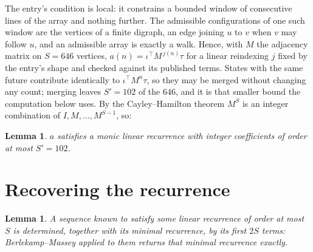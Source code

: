 \documentclass[11pt,a4paper]{article}
\theoremstyle{plain}
\newtheorem{lemma}[theorem]{Lemma}
\theoremstyle{definition}
\begin{document}
The entry's condition is local: it constrains a bounded window of consecutive lines of the
array and nothing further. The admissible configurations of one such window are the vertices
of a finite digraph, an edge joining $u$ to $v$ when $v$ may follow $u$, and an admissible
array is exactly a walk. Hence, with $M$ the adjacency matrix on $S=646$ vertices,
$a(n)=\iota^{\!\top}M^{\,j(n)}\tau$ for a linear reindexing $j$ fixed by the entry's shape
and checked against its published terms. States with the same future contribute identically to $\iota^{\!\top}M^n\tau$, so they may be merged without changing any count; merging leaves $S'=102$ of the $646$, and it is that smaller bound the computation below uses. By the Cayley--Hamilton theorem $M^{S}$ is an
integer combination of $I,M,\dots,M^{S-1}$, so:

\begin{lemma}\label{lem:cf}
$a$ satisfies a monic linear recurrence with integer coefficients of order at most
$S'=102$.
\end{lemma}

\section{Recovering the recurrence}

\begin{lemma}\label{lem:bm}
A sequence known to satisfy some linear recurrence of order at most $S$ is determined, together
with its minimal recurrence, by its first $2S$ terms: Berlekamp--Massey applied to them returns
that minimal recurrence exactly.
\end{lemma}
\end{document}
